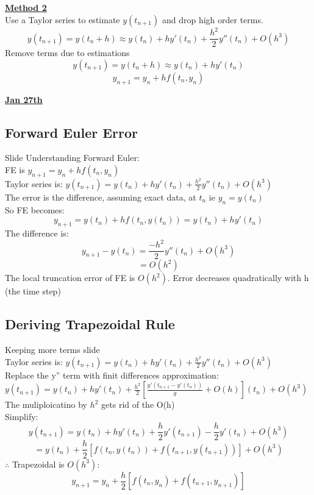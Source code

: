 \documentclass[12pt]{article}
\newcommand{\myt}[1]{\textbf{\underline{#1}}}
\begin{document}
	\myt{Method 2}\\
	Use a Taylor series to estimate $y(t_{n+1})$ and drop high order terms.\\
	$$y(t_{n+1}) = y(t_n + h) \approx y(t_n) + hy'(t_n) + \frac{h^2}{2}y''(t_n) + O(h^3)$$
	Remove terms due to estimations
	$$y(t_{n+1}) = y(t_n + h) \approx y(t_n) + hy'(t_n)$$
	$$y_{n+1} = y_n + hf(t_n, y_n)$$
	
	\myt{Jan 27th}\\
	
	\subsection*{Forward Euler Error}
	Slide Understanding Forward Euler:\\
	
	FE is $y_{n+1} = y_n + hf(t_n, y_n)$\\
	Taylor series is: $y(t_{n+1}) = y(t_n) + hy'(t_n) + \frac{h^2}{2}y''(t_n) + O(h^3)$\\
	The error is the difference, assuming exact data, at $t_n$ ie $y_n = y(t_n)$\\
	
	So FE becomes:
	$$y_{n+1} = y(t_n) + hf(t_n,y(t_n)) = y(t_n) + hy'(t_n)$$
	The difference is:\\
	$$y_{n+1} - y(t_n) = \frac{-h^2}{2}y''(t_n) + O(h^3)$$
	$$= O(h^2)$$
	The local truncation error of FE is $O(h^2)$. Error decreases quadratically with h (the time step)\\
	
	\subsection*{Deriving Trapezoidal Rule}
	Keeping more terms slide\\
	
	Taylor series is: $y(t_{n+1}) = y(t_n) + hy'(t_n) + \frac{h^2}{2}y''(t_n) + O(h^3)$\\
	Replace the y'' term with finit differences approximation:\\
	$y(t_{n+1}) = y(t_n) + hy'(t_n) + \frac{h^2}{2}[\frac{y'(t_{n+1} - y'(t_n))}{g} + O(h)](t_n) + O(h^3)$\\
	The muliploicatino by $h^2$ gets rid of the O(h)\\
	
	Simplify:\\
	$$y(t_{n+1}) = y(t_n) + hy'(t_n) + \frac{h}{2}y'(t_{n+1}) - \frac{h}{2}y'(t_n) + O(h^3)$$
	$$= y(t_n) + \frac{h}{2}[f(t_n, y(t_n)) + f(t_{n+1}, y(t_{n+1}))] + O(h^3)$$
	$\therefore$ Trapezoidal is $O(h^3)$:\\
	$$y_{n+1} = y_n + \frac{h}{2}[f(t_n, y_n) + f(t_{n+1}, y_{n+1})]$$
	
\end{document}
